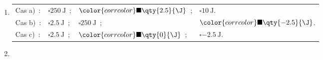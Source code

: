 \begin{enumerate}
    \item \mbox{}
          \begin{tabular}[t]{llll} 
              Cas a)~:  & $\square\qty{250}{\J}$~;
                     & ${\color{corrcolor}\blacksquare}\qty{2.5}{\J}$~;
                     & $\square\qty{10}{\J}$. \\
              Cas b)~:  & $\square\qty{2.5}{\J}$~; & $\square\qty{250}{\J}$~;
                     & ${\color{corrcolor}\blacksquare}\qty{-2.5}{\J}$. \\
              Cas c)~:  & $\square\qty{2.5}{\J}$~;
                     & ${\color{corrcolor}\blacksquare}\qty{0}{\J}$~;
                     & $\square\qty{-2.5}{\J}$. \\
          \end{tabular}
    \item 
\end{enumerate}

